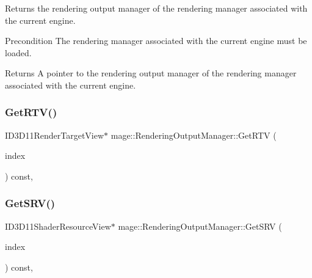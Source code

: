 Returns the rendering output manager of the rendering manager associated with the current engine.

\begin{DoxyPrecond}{Precondition}
The rendering manager associated with the current engine must be loaded. 
\end{DoxyPrecond}
\begin{DoxyReturn}{Returns}
A pointer to the rendering output manager of the rendering manager associated with the current engine. 
\end{DoxyReturn}
\hypertarget{classmage_1_1_rendering_output_manager_a367665fe249f8dd373ae48f4f6c731bd}{}\label{classmage_1_1_rendering_output_manager_a367665fe249f8dd373ae48f4f6c731bd} 
\subsubsection{\texorpdfstring{Get\+R\+T\+V()}{GetRTV()}}
{\footnotesize\ttfamily I\+D3\+D11\+Render\+Target\+View$\ast$ mage\+::\+Rendering\+Output\+Manager\+::\+Get\+R\+TV (\begin{DoxyParamCaption}\item[{\hyperlink{classmage_1_1_rendering_output_manager_a776a03191e0a424d8e014414d9d44cef}{R\+T\+V\+Index}}]{index }\end{DoxyParamCaption}) const\hspace{0.3cm}{\ttfamily [private]}, {\ttfamily [noexcept]}}

\hypertarget{classmage_1_1_rendering_output_manager_adbccd7240023dd803ce7764e6d4e3298}{}\label{classmage_1_1_rendering_output_manager_adbccd7240023dd803ce7764e6d4e3298} 
\subsubsection{\texorpdfstring{Get\+S\+R\+V()}{GetSRV()}}
{\footnotesize\ttfamily I\+D3\+D11\+Shader\+Resource\+View$\ast$ mage\+::\+Rendering\+Output\+Manager\+::\+Get\+S\+RV (\begin{DoxyParamCaption}\item[{\hyperlink{classmage_1_1_rendering_output_manager_ab23ee4985ed0d176479fe796dc3a4cfd}{S\+R\+V\+Index}}]{index }\end{DoxyParamCaption}) const\hspace{0.3cm}{\ttfamily [private]}, {\ttfamily [noexcept]}}

